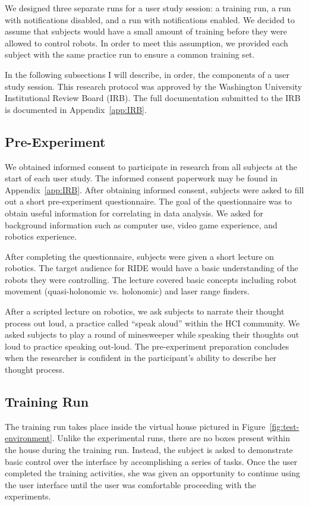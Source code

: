 We designed three separate runs for a user study session: a training run, a run with notifications disabled, and a run with notifications enabled. We decided to assume that subjects would have a small amount of training before they were allowed to control robots. In order to meet this assumption, we provided each subject with the same practice run to ensure a common training set.

In the following subsections I will describe, in order, the components of a user study session. This research protocol was approved by the Washington University Institutional Review Board (IRB). The full documentation submitted to the IRB is documented in Appendix~\ref{app:IRB}.

\subsection{Pre-Experiment} %
\label{sub:pre_experiment}
We obtained informed consent to participate in research from all subjects at the start of each user study. The informed consent paperwork may be found in Appendix~\ref{app:IRB}. After obtaining informed consent, subjects were asked to fill out a short pre-experiment questionnaire. The goal of the questionnaire was to obtain useful information for correlating in data analysis. We asked for background information such as computer use, video game experience, and robotics experience.

After completing the questionnaire, subjects were given a short lecture on robotics. The target audience for RIDE would have a basic understanding of the robots they were controlling. The lecture covered basic concepts including robot movement (quasi-holonomic vs. holonomic) and laser range finders.

After a scripted lecture on robotics, we ask subjects to narrate their thought process out loud, a practice called ``speak aloud'' within the HCI community. We asked subjects to play a round of minesweeper while speaking their thoughts out loud to practice speaking out-loud. The pre-experiment preparation concludes when the researcher is confident in the participant's ability to describe her thought process.

\subsection{Training Run} %
\label{sub:training_run}
The training run takes place inside the virtual house pictured in Figure~\ref{fig:test-environment}. Unlike the experimental runs, there are no boxes present within the house during the training run. Instead, the subject is asked to demonstrate basic control over the interface by accomplishing a series of tasks. Once the user completed the training activities, she was given an opportunity to continue using the user interface until the user was comfortable proceeding with the experiments.

